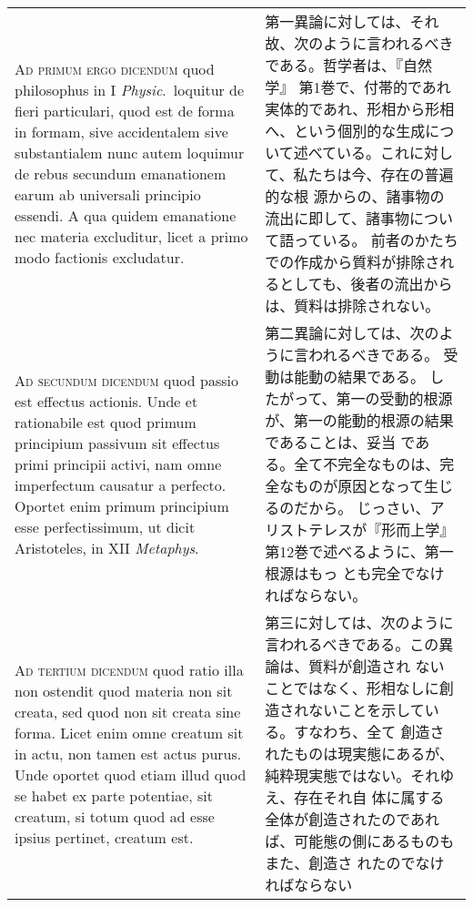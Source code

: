 \documentclass[10pt]{jsarticle} %
\begin{document}
\begin{longtable}{p{21em}p{21em}}
\\




{\scshape Ad primum ergo dicendum} quod philosophus in I {\it Physic}.~loquitur de fieri
particulari, quod est de forma in formam, sive accidentalem sive
substantialem nunc autem loquimur de rebus secundum emanationem earum ab
universali principio essendi. A qua quidem emanatione nec materia
excluditur, licet a primo modo factionis excludatur.

&

第一異論に対しては、それ故、次のように言われるべきである。哲学者は、『自然学』
第1巻で、付帯的であれ実体的であれ、形相から形相へ、という個別的な生成につ
いて述べている。これに対して、私たちは今、存在の普遍的な根
源からの、諸事物の流出に即して、諸事物について語っている。
前者のかたちでの作成から質料が排除されるとしても、後者の流出からは、質料は排除されない。

\\

{\scshape Ad secundum dicendum} quod passio est effectus actionis. Unde
 et rationabile est quod primum principium passivum sit effectus primi
 principii activi, nam omne imperfectum causatur a perfecto. Oportet
 enim primum principium esse perfectissimum, ut dicit Aristoteles, in
 XII {\itshape Metaphys}.

&

第二異論に対しては、次のように言われるべきである。
受動は能動の結果である。
したがって、第一の受動的根源が、第一の能動的根源の結果であることは、妥当
 である。全て不完全なものは、完全なものが原因となって生じるのだから。
じっさい、アリストテレスが『形而上学』第12巻で述べるように、第一根源はもっ
 とも完全でなければならない。


\\

{\scshape Ad tertium dicendum} quod ratio illa non ostendit quod materia
 non sit creata, sed quod non sit creata sine forma. Licet enim omne
 creatum sit in actu, non tamen est actus purus. Unde oportet quod etiam
 illud quod se habet ex parte potentiae, sit creatum, si totum quod ad
 esse ipsius pertinet, creatum est.

&

第三に対しては、次のように言われるべきである。この異論は、質料が創造され
ないことではなく、形相なしに創造されないことを示している。すなわち、全て
創造されたものは現実態にあるが、純粋現実態ではない。それゆえ、存在それ自
体に属する全体が創造されたのであれば、可能態の側にあるものもまた、創造さ
れたのでなければならない

\end{longtable}
\newpage
{}
\end{document}
